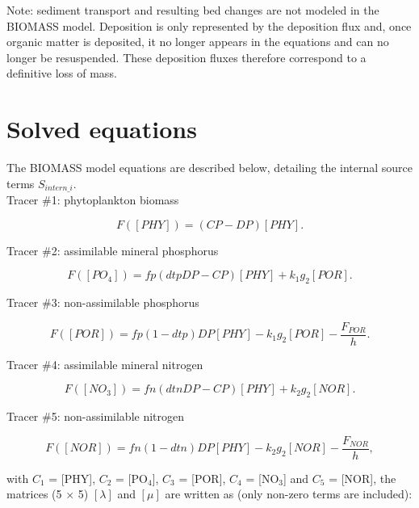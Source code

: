 Note: sediment transport and resulting bed changes are not modeled in the BIOMASS model.
Deposition is only represented by the deposition flux and,
once organic matter is deposited,
it no longer appears in the equations and can no longer be resuspended.
These deposition fluxes therefore correspond to a definitive loss of mass.

\section{Solved equations}

The BIOMASS model equations are described below, detailing the internal source terms $S_{intern\_i}$.\\

Tracer $\#$1: phytoplankton biomass

\begin{equation}
  F([PHY]) = (CP-DP) [PHY].
\end{equation}

Tracer $\#$2: assimilable mineral phosphorus

\begin{equation}
  F([PO_4]) = fp(dtp DP - CP) [PHY] + k_1 g_2 [POR].
\end{equation}

Tracer $\#$3: non-assimilable phosphorus

\begin{equation}
  F([POR]) = fp(1-dtp) DP [PHY] - k_1 g_2 [POR] - \frac{F_{POR}}{h}.
\end{equation}

Tracer $\#$4: assimilable mineral nitrogen

\begin{equation}
  F([NO_3]) = fn (dtn DP - CP) [PHY] + k_2 g_2 [NOR].
\end{equation}

Tracer $\#$5: non-assimilable nitrogen

\begin{equation}
  F([NOR]) = fn (1- dtn) DP [PHY] - k_2 g_2 [NOR] - \frac{F_{NOR}}{h},
\end{equation}

with $C_1$ = [PHY], $C_2$ = [PO$_4$], $C_3$ = [POR], $C_4$ = [NO$_3$] and $C_5$ = [NOR],
the matrices (5 $\times$ 5) $[\lambda]$ and $[\mu]$
are written as (only non-zero terms are included):

